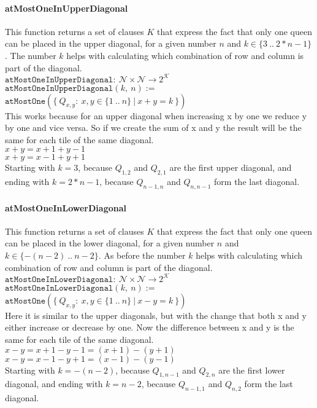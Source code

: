 \paragraph{atMostOneInUpperDiagonal}
This function returns a set of clauses $K$ that express the fact that only one queen can be placed in the upper diagonal, for a given number $n$ and $k \in \{3\ ..\ 2 * n - 1\}$. The number $k$ helps with calculating which combination of row and column is part of the diagonal.
\\[0.2cm]
\hspace*{1.3cm} $\texttt{atMostOneInUpperDiagonal}:\ \mathcal{N} \times \mathcal{N} \to 2^{\mathcal{K}}$
\\[0.2cm]
\hspace*{1.3cm} $\texttt{atMostOneInUpperDiagonal}(k,\ n) :=$
\\
\hspace*{2.6cm} $\texttt{atMostOne}(\{\ Q_{x,y} :\ x,y \in \{1\ ..\ n\}\ |\ x + y = k\ \})$
\\[0.2cm]
This works because for an upper diagonal when increasing x by one we reduce y by one and vice versa. So if we create the sum of x and y the result will be the same for each tile of the same diagonal.
\\[0.2cm]
$x + y = x + 1 + y - 1$\\
$x + y = x - 1 + y + 1$
\\[0.2cm]
Starting with $k = 3$, because $Q_{1,2}$ and $Q_{2,1}$ are the first upper diagonal, and ending with $k = 2 * n - 1$, because $Q_{n - 1, n}$ and $Q_{n, n - 1}$ form the last diagonal.

\paragraph{atMostOneInLowerDiagonal}
This function returns a set of clauses $K$ that express the fact that only one queen can be placed in the lower diagonal, for a given number $n$ and $k \in \{-(n - 2)\ ..\ n - 2\}$. As before the number $k$ helps with calculating which combination of row and column is part of the diagonal.
\\[0.2cm]
\hspace*{1.3cm} $\texttt{atMostOneInLowerDiagonal}:\ \mathcal{N} \times \mathcal{N} \to 2^{\mathcal{K}}$
\\[0.2cm]
\hspace*{1.3cm} $\texttt{atMostOneInLowerDiagonal}(k,\ n) :=$
\\
\hspace*{2.6cm} $\texttt{atMostOne}(\{\ Q_{x,y} :\ x,y \in \{1\ ..\ n\}\ |\ x - y = k\ \})$
\\[0.2cm]
Here it is similar to the upper diagonals, but with the change that both x and y either increase or decrease by one. Now the difference between x and y is the same for each tile of the same diagonal.
\\[0.2cm]
$x - y = x + 1 - y - 1 = (x + 1) - (y + 1)$\\
$x - y = x - 1 - y + 1 = (x - 1) - (y - 1)$
\\[0.2cm]
Starting with $k = -(n - 2)$, because $Q_{1,n - 1}$ and $Q_{2,n}$ are the first lower diagonal, and ending with $k = n - 2$, because $Q_{n - 1, 1}$ and $Q_{n, 2}$ form the last diagonal.

